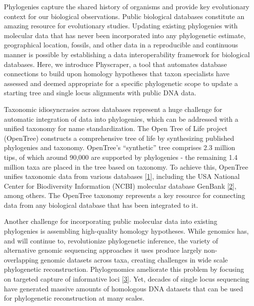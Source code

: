 \documentclass[]{article}
\begin{document}
Phylogenies capture the shared history of organisms and provide key evolutionary context for our biological observations.
Public biological databases constitute an amazing resource for evolutionary studies. Updating existing phylogenies with molecular data that has never been incorporated into any phylogenetic estimate, geographical location, fossils, and other data in a reproducible and continuous manner is possible by establishing a data interoperability framework for biological databases. Here, we introduce Physcraper, a tool that automates database connections to build upon homology hypotheses that taxon specialists have assessed and deemed appropriate for a specific phylogenetic scope to update a starting tree and single locus alignments with public DNA data.

Taxonomic idiosyncrasies across databases represent a huge challenge for automatic integration of data into phylogenies, which can be addressed with a unified taxonomy for name standardization. The Open Tree of Life project (OpenTree)
constructs a comprehensive tree of life by synthesizing published phylogenies and taxonomy. OpenTree's ``synthetic'' tree comprises 2.3 million tips, of which around 90,000 are supported by phylogenies - the remaining 1.4 million taxa are placed in the tree based on taxonomy. To achieve this, OpenTree unifies taxonomic data from various databases {[}\protect\hyperlink{ref-rees2017automated}{1}{]}, including the USA National Center for Biodiversity Information (NCBI) molecular database GenBank {[}\protect\hyperlink{ref-benson2000genbank}{2}{]}, among others. The OpenTree taxonomy represents a key resource for connecting data from any biological database that has been integrated to it.

Another challenge for incorporating public molecular data into existing phylogenies is assembling high-quality homology hypotheses.
While genomics has, and will continue to, revolutionize phylogenetic inference, the variety of alternative genomic sequencing approaches it uses produce largely non-overlapping genomic datasets across taxa, creating challenges in wide scale phylogenetic reconstruction.
Phylogenomics ameliorate this problem by focusing on targeted capture of informative loci {[}\protect\hyperlink{ref-andermann2020guide}{3}{]}. Yet, decades of single locus sequencing have generated massive amounts of homologous DNA datasets that can be used for phylogenetic reconstruction at many scales.
\end{document}
